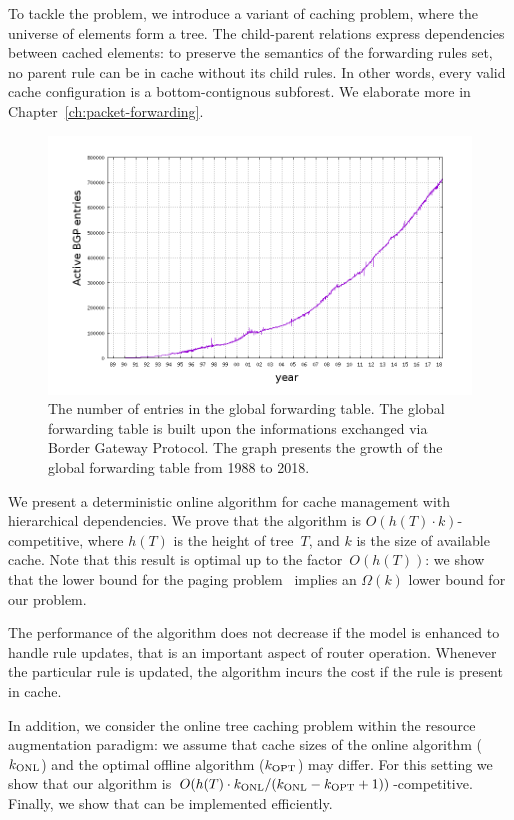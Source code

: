 To tackle the problem, we introduce a variant of caching problem, where the universe of elements form a tree.
The child-parent relations express dependencies between cached elements: to preserve the semantics of the forwarding rules set, no parent rule can be in cache without its child rules.
In other words, every valid cache configuration is a bottom-contignous subforest.
We elaborate more in Chapter~\ref{ch:packet-forwarding}.


\begin{figure}[t]
\centering
\includegraphics[width=0.79\columnwidth]{figs/bgp-entries.png}
\caption{The number of entries in the global forwarding table. The global forwarding table is built upon the informations exchanged via Border Gateway Protocol. The graph presents the growth of the global forwarding table from 1988 to 2018.}\label{fig:bgp-entries}
\end{figure}


We present a deterministic online algorithm for cache management with hierarchical dependencies.
We prove that the algorithm is
$O(h(T)\cdot k)$-competitive, where $h(T)$ is the height of tree~$T$, and $k$ is the size of available cache.
Note that this
result is optimal up to the factor~$O(h(T))$: we show that the lower
bound for the paging problem~\cite{competitive-analysis} implies an
$\Omega(k)$ lower bound for our problem.

The performance of the algorithm does not decrease if the model is enhanced to handle rule updates, that is an important aspect of router operation.
Whenever the particular rule is updated, the algorithm incurs the cost if the rule is present in cache.

In addition, we consider the online tree caching problem within the resource
augmentation paradigm: we assume that cache sizes of the online algorithm
($k_\textnormal{ONL}$)  and the optimal offline algorithm ($k_\textnormal{OPT}$) may differ.
For this setting we show that our algorithm is
$O(h(T) \cdot k_\textnormal{ONL}/(k_\textnormal{ONL}-k_\textnormal{OPT}+1))$-competitive.
Finally, we show that \ALG can be
implemented efficiently.

